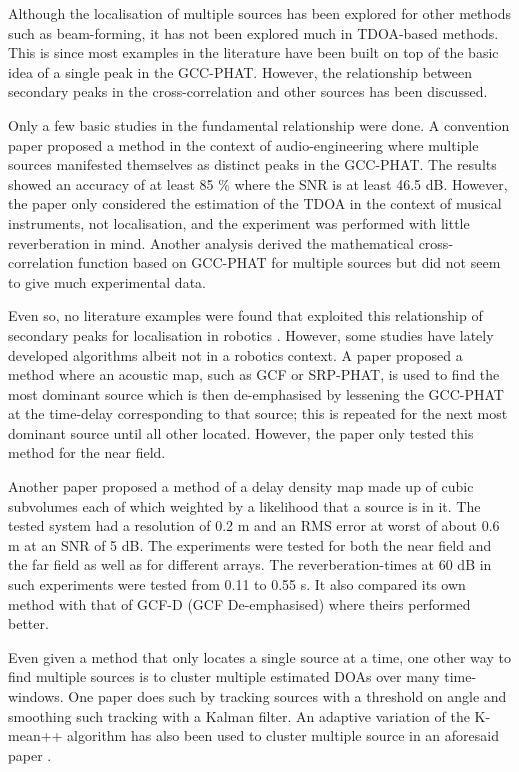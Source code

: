 \documentclass{report}
\begin{document}
Although the localisation of multiple sources has been explored for other methods such as beam-forming, it has not been explored much in TDOA-based methods. This is since most examples in the literature have been built on top of the basic idea of a single peak in the GCC-PHAT. However, the relationship between secondary peaks in the cross-correlation and other sources has been discussed.

Only a few basic studies in the fundamental relationship were done. A convention paper \cite{clifford_calculating_2010} proposed a method in the context of audio-engineering where multiple sources manifested themselves as distinct peaks in the GCC-PHAT. The results showed an accuracy of at least 85 \% where the SNR is at least 46.5 \si{dB}. However, the paper only considered the estimation of the TDOA in the context of musical instruments, not localisation, and the experiment was performed with little reverberation in mind. Another analysis \cite{kwon_analysis_2010} derived the mathematical cross-correlation function based on GCC-PHAT for multiple sources but did not seem to give much experimental data. 

Even so, no literature examples were found that exploited this relationship of secondary peaks for localisation in robotics \cite{rascon_localization_2017}. However, some studies have lately developed algorithms albeit not in a robotics context. A paper \cite{brutti_multiple_2010} proposed a method where an acoustic map, such as GCF or SRP-PHAT, is used to find the most dominant source which is then de-emphasised by lessening the GCC-PHAT at the time-delay corresponding to that source; this is repeated for the next most dominant source until all other located. However, the paper only tested this method for the near field.

Another paper \cite{boora_tdoa-based_2020} proposed a method of a delay density map made up of cubic subvolumes each of which weighted by a likelihood that a source is in it. The tested system had a resolution of 0.2 \si{m} and an RMS error at worst of about 0.6 \si{m} at an SNR of 5 \si{dB}. The experiments were tested for both the near field and the far field as well as for different arrays. The reverberation-times at 60 \si{dB} in such experiments were tested from 0.11 to 0.55 \si{s}. It also compared its own method with that of GCF-D (GCF De-emphasised) where theirs performed better.

Even given a method that only locates a single source at a time, one other way to find multiple sources is to cluster multiple estimated DOAs over many time-windows. One paper \cite{rascon_lightweight_2015} does such by tracking sources with a threshold on angle and smoothing such tracking with a Kalman filter. An adaptive variation of the K-mean++ algorithm has also been used to cluster multiple source in an aforesaid paper \cite{hu_estimation_2009}.
\end{document}
